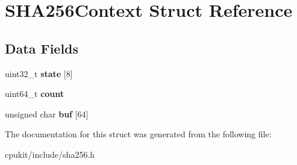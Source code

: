 \hypertarget{structSHA256Context}{}\section{S\+H\+A256\+Context Struct Reference}
\label{structSHA256Context}
\subsection*{Data Fields}
\begin{DoxyCompactItemize}
\item 
\mbox{\label{structSHA256Context_a2d570a690e4a6a3cd056eb7550c24b91}} 
uint32\+\_\+t {\bfseries state} \mbox{[}8\mbox{]}
\item 
\mbox{\label{structSHA256Context_a68d7950d5ea10d254be636a53f71a3cd}} 
uint64\+\_\+t {\bfseries count}
\item 
\mbox{\label{structSHA256Context_ad67eee5e7a4076615d1f79d4030c1019}} 
unsigned char {\bfseries buf} \mbox{[}64\mbox{]}
\end{DoxyCompactItemize}


The documentation for this struct was generated from the following file\+:\begin{DoxyCompactItemize}
\item 
cpukit/include/sha256.\+h\end{DoxyCompactItemize}
